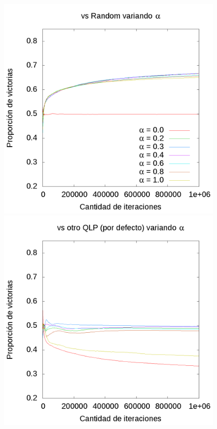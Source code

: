 \documentclass[10pt, a4paper]{article}
\begin{document}
\begin{figure}[h]
\begin{minipage}[c]{1\textwidth}
  \end{minipage}
  \begin{minipage}[c]{1\textwidth}
	\includegraphics[scale=0.2]{AlphaR.png}
	\includegraphics[scale=0.2]{AlphaQ.png}

\end{minipage}
\end{figure}
\end{document}
